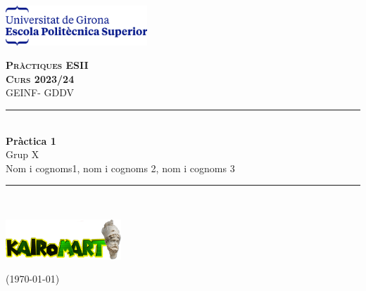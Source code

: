 \documentclass[12pt,a4paper]{article}
\begin{document}
    \begin{titlepage}
        \newcommand{\HRule}{\rule{\linewidth}{0.5mm}} %
        \begin{flushleft}
            \includegraphics[height=1.5cm]{EPS.png}\\\vfill
        \end{flushleft}
        \center %
        \textsc{\huge \bfseries Pràctiques ESII}\\[0.25cm]
        \textsc{\Large \bfseries Curs 2023/24}\\[0.25cm]
        \textsc{\large GEINF- GDDV }
        \HRule \\[0.4cm]
        { \huge \bfseries Pràctica 1} \\[0.4cm] %
Grup X \\ Nom i cognoms1, nom i cognoms 2, nom i cognoms 3
        \HRule \\\vfill
        \begin{minipage}{0.4\textwidth}
            \begin{flushleft}
                \includegraphics[height=1.5cm]{KairoMart}
            \end{flushleft}
        \end{minipage}
        \hfill
        \begin{minipage}{0.4\textwidth}
            \begin{flushright} \large
                {\small (\today)}
            \end{flushright}
        \end{minipage}
    \end{titlepage}
\end{document}
